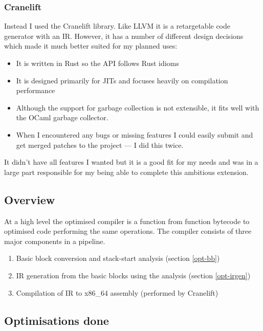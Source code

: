 \subsubsection{Cranelift}

Instead I used the Cranelift library. Like LLVM it is a retargetable code generator with an IR.
However, it has a number of different design decisions which made it much better suited for my
planned uses:

\begin{itemize}
      \item It is written in Rust so the API follows Rust idioms
      \item It is designed primarily for JITs and focuses heavily on compilation performance
      \item Although the support for garbage collection is not extensible, it fits well with the
            OCaml garbage collector.
      \item When I encountered any bugs or missing features I could easily submit and get merged
            patches to the project --- I did this twice.
\end{itemize}

It didn't have all features I wanted but it is a good fit for my needs and was in a large part
responsible for my being able to complete this ambitious extension.

\subsection{Overview}

At a high level the optimised compiler is a function from function bytecode to optimised code
performing the same operations.  The compiler consists of three major components in a pipeline.

\begin{enumerate}
      \item Basic block conversion and stack-start analysis (section \ref{opt-bb})
      \item IR generation from the basic blocks using the analysis (section \ref{opt-irgen})
      \item Compilation of IR to x86\_64 assembly (performed by Cranelift)
\end{enumerate}

\subsection{Optimisations done}

